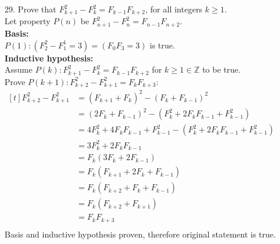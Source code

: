 \documentclass[letterpaper,fleqn,leqno]{article}
\begin{document}
{{\begin{enumerate}
				\item [29.]
				Prove that $F^2_{k+1}-F^2_k=F_{k-1}F_{k+2}$, for all integers $k\geq1$. \\
				Let property $P(n)$ be $F^2_{n+1}-F^2_n=F_{n-1}F_{n+2}$. \\
				\textbf{Basis:} \\
				$P(1): (F^2_2-F^1_1=3)=(F_0F_3=3)$ is true. \\
				\textbf{Inductive hypothesis:} \\
				Assume $P(k): F^2_{k+1}-F^2_k=F_{k-1}F_{k+2}$ for $k\geq1\in\mathbb{Z}$ to be true. \\
				Prove $P(k+1): F^2_{k+2}-F^2_{k+1}=F_kF_{k+3}$: \\
				$\begin{aligned}[t]
					F^2_{k+2}-F^2_{k+1} &= (F_{k+1}+F_k)^2-(F_k+F_{k-1})^2 \\
					&= (2F_k+F_{k-1})^2-(F^2_k+2F_kF_{k-1}+F^2_{k-1}) \\
					&= 4F^2_k+4F_kF_{k-1}+F^2_{k-1}-(F^2_k+2F_kF_{k-1}+F^2_{k-1}) \\
					&= 3F^2_k+2F_kF_{k-1} \\
					&= F_k(3F_k+2F_{k-1}) \\
					&= F_k(F_{k+1}+2F_k+F_{k-1}) \\
					&= F_k(F_{k+2}+F_k+F_{k-1}) \\
					&= F_k(F_{k+2}+F_{k+1}) \\
					&= F_kF_{k+3} \\
				\end{aligned}$ \\
				Basis and inductive hypothesis proven, therefore original statement is true. \\
			\end{enumerate}
		}
	}
\end{document}
